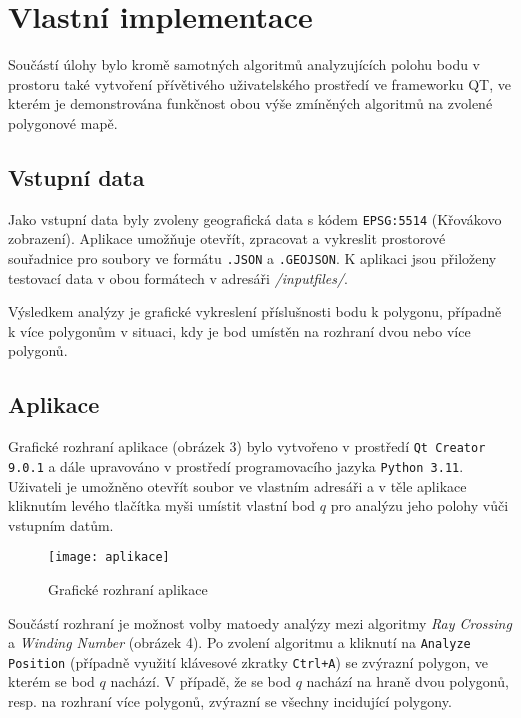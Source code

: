 \chapter*{Vlastní implementace}

\par Součástí úlohy bylo kromě samotných algoritmů analyzujících polohu bodu v prostoru také vytvoření přívětivého uživatelského prostředí ve frameworku QT, ve kterém je demonstrována funkčnost obou výše zmíněných algoritmů
na zvolené polygonové mapě. 

\section*{Vstupní data}
\par Jako vstupní data byly zvoleny geografická data s kódem \verb|EPSG:5514| (Křovákovo zobrazení). Aplikace umožňuje otevřít, zpracovat a vykreslit prostorové souřadnice pro soubory ve formátu \verb|.JSON| a \verb|.GEOJSON|. K aplikaci jsou přiloženy testovací data v obou formátech v adresáři \emph{/input\textunderscore files/}.
\par Výsledkem analýzy je grafické vykreslení příslušnosti bodu k polygonu, případně k více polygonům v situaci, kdy je bod umístěn na rozhraní dvou nebo více polygonů.

\bigbreak

\section*{Aplikace}
\par Grafické rozhraní aplikace (obrázek 3) bylo vytvořeno v prostředí \verb|Qt Creator 9.0.1| a dále upravováno v prostředí programovacího jazyka \verb|Python 3.11|. Uživateli je umožněno otevřít soubor ve vlastním adresáři a v těle aplikace kliknutím levého tlačítka myši umístit vlastní bod $q$ pro analýzu jeho polohy vůči vstupním datům. 

\begin{figure}[h]
    \centering
        \texttt{[image: aplikace]} 
        \caption{Grafické rozhraní aplikace}
\end{figure}

\par Součástí rozhraní je možnost volby matoedy analýzy mezi algoritmy \emph{Ray Crossing} a \emph{Winding Number} (obrázek 4). Po zvolení algoritmu a kliknutí na \verb|Analyze Position| (případně využití klávesové zkratky \verb|Ctrl+A|) se zvýrazní polygon, ve kterém se bod $q$ nachází. V případě, že se bod $q$ nachází na hraně dvou polygonů, resp. na rozhraní více polygonů, zvýrazní se všechny incidující polygony.

